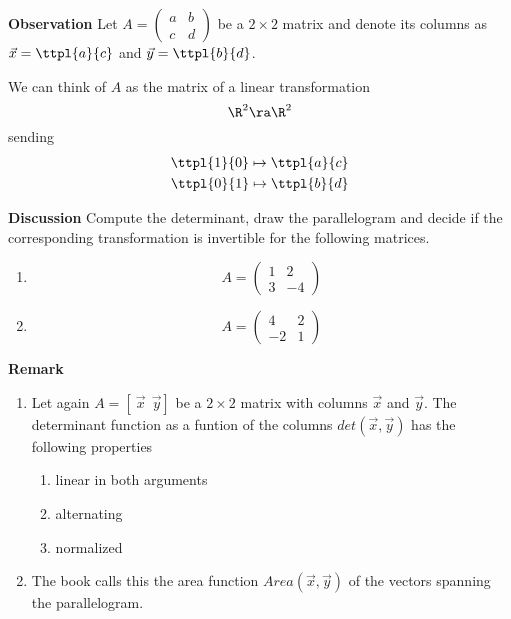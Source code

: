 \documentclass[letterpaper, 10pt]{article}
\begin{document}
\newpage
\lb
\textbf{Observation}
\lb
Let $A = \begin{pmatrix} a & b \\ c & d \end{pmatrix}$ be a $2 \times 2$ matrix and denote
its columns as $\vec x = \ttpl{a}{c}$ and $\vec y = \ttpl{b}{d}$.

\lb
We can think of $A$ as the matrix of a linear transformation
\[ \R^2 \ra \R^2 \]
sending 
\begin{align*}
    \ttpl{1}{0} \mapsto \ttpl{a}{c} \\
    \ttpl{0}{1} \mapsto \ttpl{b}{d}
\end{align*}







\newpage
\lb
\textbf{Discussion}
\lb
Compute the determinant, draw the parallelogram and decide if the corresponding transformation
is invertible for the following matrices.
\begin{enumerate}
    \item
        \[ A = \begin{pmatrix} 1 & 2 \\ 3 & -4 \end{pmatrix} \]
    \vspace{200pt}
    \item
        \[ A = \begin{pmatrix} 4 & 2 \\ -2 & 1 \end{pmatrix} \]
\end{enumerate}





\newpage
\lb
\textbf{Remark}
\lb
\begin{enumerate}
    \item Let again $A = [ ~ \vec x ~~ \vec y ] $ be a $ 2 \times 2 $ matrix with columns
        $\vec x$ and $\vec y$.
        The determinant function as a funtion of the columns $ det(\vec x, \vec y)$
        has the following properties
        \begin{enumerate}
            \item linear in both arguments
            \vspace{50pt}
            \item alternating
            \vspace{50pt}
            \item normalized
            \vspace{50pt}
        \end{enumerate}
    \item
        The book calls this the area function $Area(\vec x , \vec y)$ of the vectors spanning
        the parallelogram.
\end{enumerate}
\end{document}
